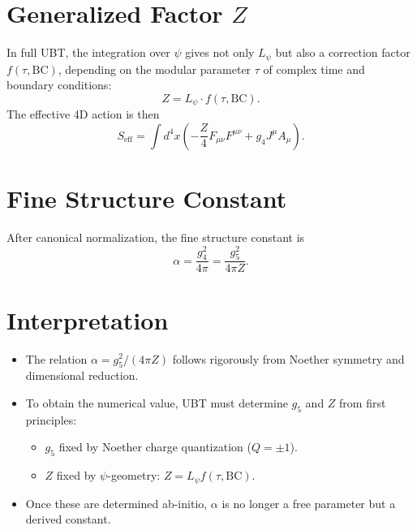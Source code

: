 \documentclass[12pt]{article}
\begin{document}
\section{Generalized Factor $Z$}
In full UBT, the integration over $\psi$ gives not only $L_\psi$ but also a correction factor $f(\tau,\text{BC})$, 
depending on the modular parameter $\tau$ of complex time and boundary conditions:
\begin{equation}
Z = L_\psi \cdot f(\tau,\text{BC}).
\end{equation}
The effective 4D action is then
\begin{equation}
S_{\text{eff}} = \int d^4x \left( -\frac{Z}{4}F_{\mu\nu}F^{\mu\nu} + g_4 J^\mu A_\mu \right).
\end{equation}

\section{Fine Structure Constant}
After canonical normalization, the fine structure constant is
\begin{equation}
\alpha = \frac{g_4^2}{4\pi} = \frac{g_5^2}{4\pi Z}.
\end{equation}

\section{Interpretation}
\begin{itemize}
\item The relation $\alpha = g_5^2 / (4\pi Z)$ follows rigorously from Noether symmetry and dimensional reduction.
\item To obtain the numerical value, UBT must determine $g_5$ and $Z$ from first principles:
  \begin{itemize}
  \item $g_5$ fixed by Noether charge quantization ($Q=\pm1$).
  \item $Z$ fixed by $\psi$-geometry: $Z=L_\psi f(\tau,\text{BC})$.
  \end{itemize}
\item Once these are determined ab-initio, $\alpha$ is no longer a free parameter but a derived constant.
\end{itemize}
\end{document}
